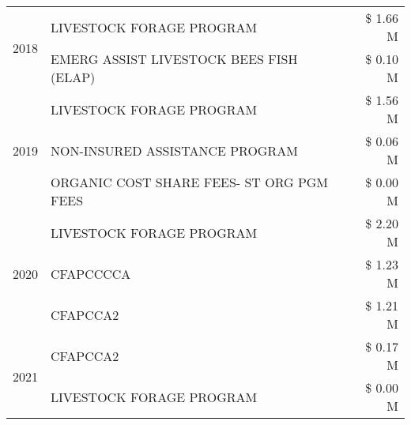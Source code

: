 \begin{tabular}{llr}
\cline{1-3}
\multirow[t]{2}{*}{2018} & LIVESTOCK FORAGE PROGRAM & \$ 1.66 M \\
 & EMERG ASSIST LIVESTOCK BEES FISH (ELAP) & \$ 0.10 M \\
\cline{1-3}
\multirow[t]{3}{*}{2019} & LIVESTOCK FORAGE PROGRAM & \$ 1.56 M \\
 & NON-INSURED ASSISTANCE PROGRAM & \$ 0.06 M \\
 & ORGANIC COST SHARE FEES- ST ORG PGM FEES & \$ 0.00 M \\
\cline{1-3}
\multirow[t]{3}{*}{2020} & LIVESTOCK FORAGE PROGRAM & \$ 2.20 M \\
 & CFAPCCCCA & \$ 1.23 M \\
 & CFAPCCA2 & \$ 1.21 M \\
\cline{1-3}
\multirow[t]{2}{*}{2021} & CFAPCCA2 & \$ 0.17 M \\
 & LIVESTOCK FORAGE PROGRAM & \$ 0.00 M \\
\cline{1-3}
\bottomrule
\end{tabular}
